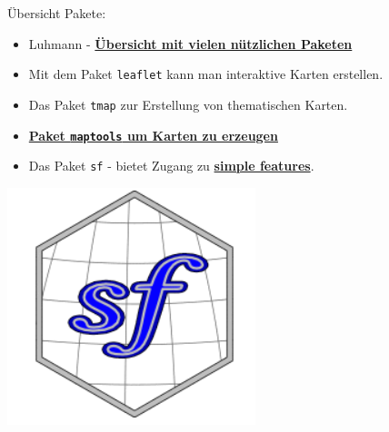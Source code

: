 \documentclass[ignorenonframetext,]{beamer}
\providecommand{\tightlist}{%
  \setlength{\itemsep}{0pt}\setlength{\parskip}{0pt}}
\begin{document}
\begin{frame}[fragile]{Übersicht Pakete:}
\protect\hypertarget{ubersicht-pakete}{}

\begin{itemize}
\tightlist
\item
  Luhmann -
  \href{http://www.beltz.de/fileadmin/beltz/downloads/OnlinematerialienPVU/28090_Luhmann/Verwendete\%20Pakete.pdf}{\textbf{Übersicht
  mit vielen nützlichen Paketen}}
\item
  Mit dem Paket \texttt{leaflet} kann man interaktive Karten erstellen.
\item
  Das Paket \texttt{tmap} zur Erstellung von thematischen Karten.
\item
  \href{http://www.r-bloggers.com/tag/maptools/}{\textbf{Paket
  \texttt{maptools} um Karten zu erzeugen}}
\item
  Das Paket \texttt{sf} - bietet Zugang zu
  \href{https://de.wikipedia.org/wiki/Simple_Feature_Access}{\textbf{simple
  features}}.
\end{itemize}

\includegraphics{figure/logo_sf.PNG}

\end{frame}
\end{document}
